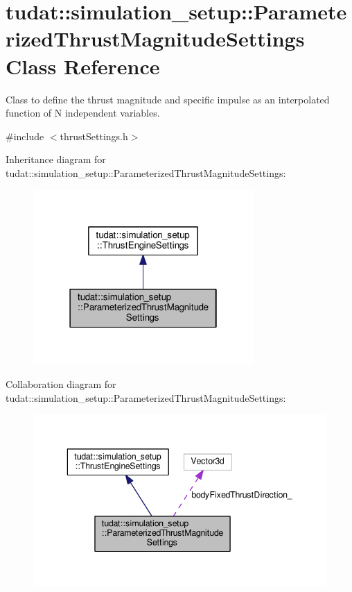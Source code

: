 \hypertarget{classtudat_1_1simulation__setup_1_1ParameterizedThrustMagnitudeSettings}{}\section{tudat\+:\+:simulation\+\_\+setup\+:\+:Parameterized\+Thrust\+Magnitude\+Settings Class Reference}
\label{classtudat_1_1simulation__setup_1_1ParameterizedThrustMagnitudeSettings}


Class to define the thrust magnitude and specific impulse as an interpolated function of N independent variables.  




{\ttfamily \#include $<$thrust\+Settings.\+h$>$}



Inheritance diagram for tudat\+:\+:simulation\+\_\+setup\+:\+:Parameterized\+Thrust\+Magnitude\+Settings\+:
\nopagebreak
\begin{figure}[H]
\begin{center}
\leavevmode
\includegraphics[width=238pt]{classtudat_1_1simulation__setup_1_1ParameterizedThrustMagnitudeSettings__inherit__graph}
\end{center}
\end{figure}


Collaboration diagram for tudat\+:\+:simulation\+\_\+setup\+:\+:Parameterized\+Thrust\+Magnitude\+Settings\+:
\nopagebreak
\begin{figure}[H]
\begin{center}
\leavevmode
\includegraphics[width=343pt]{classtudat_1_1simulation__setup_1_1ParameterizedThrustMagnitudeSettings__coll__graph}
\end{center}
\end{figure}
